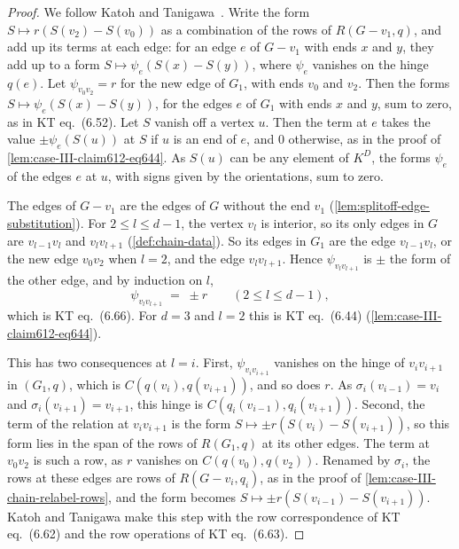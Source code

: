 \begin{proof}
  \leanok
  We follow Katoh and Tanigawa~\cite[pp.~696--698]{katohTanigawa2011}.
  Write the form $S \mapsto r(S(v_2) - S(v_0))$ as a combination of the
  rows of $R(G - v_1, q)$, and add up its terms at each edge: for an edge
  $e$ of $G - v_1$ with ends $x$ and $y$, they add up to a form
  $S \mapsto \psi_e(S(x) - S(y))$, where $\psi_e$ vanishes on the hinge
  $q(e)$. Let $\psi_{v_0 v_2} = r$ for the new edge of $G_1$, with ends
  $v_0$ and $v_2$. Then the forms $S \mapsto \psi_e(S(x) - S(y))$, for the
  edges $e$ of $G_1$ with ends $x$ and $y$, sum to zero, as in KT
  eq.~(6.52). Let $S$ vanish off a vertex $u$. Then the term at $e$ takes
  the value $\pm \psi_e(S(u))$ at $S$ if $u$ is an end of $e$, and $0$
  otherwise, as in the proof of \cref{lem:case-III-claim612-eq644}. As
  $S(u)$ can be any element of $K^D$, the forms $\psi_e$ of the edges $e$
  at $u$, with signs given by the orientations, sum to zero.

  The edges of $G - v_1$ are the edges of $G$ without the end $v_1$
  (\cref{lem:splitoff-edge-substitution}). For $2 \le l \le d - 1$, the
  vertex $v_l$ is interior, so its only edges in $G$ are $v_{l-1} v_l$
  and $v_l v_{l+1}$ (\cref{def:chain-data}). So its edges in $G_1$ are
  the edge $v_{l-1} v_l$, or the new edge $v_0 v_2$ when $l = 2$, and the
  edge $v_l v_{l+1}$. Hence $\psi_{v_l v_{l+1}}$ is $\pm$ the form of the
  other edge, and by induction on $l$,
  \[
    \psi_{v_l v_{l+1}} \;=\; \pm r \qquad (2 \le l \le d - 1),
  \]
  which is KT eq.~(6.66). For $d = 3$ and $l = 2$ this is KT eq.~(6.44)
  (\cref{lem:case-III-claim612-eq644}).

  This has two consequences at $l = i$. First, $\psi_{v_i v_{i+1}}$
  vanishes on the hinge of $v_i v_{i+1}$ in $(G_1, q)$, which is
  $C(q(v_i), q(v_{i+1}))$, and so does $r$. As $\sigma_i(v_{i-1}) = v_i$
  and $\sigma_i(v_{i+1}) = v_{i+1}$, this hinge is
  $C(q_i(v_{i-1}), q_i(v_{i+1}))$. Second, the term of the relation at
  $v_i v_{i+1}$ is the form $S \mapsto \pm r(S(v_i) - S(v_{i+1}))$, so
  this form lies in the span of the rows of $R(G_1, q)$ at its other
  edges. The term at $v_0 v_2$ is such a row, as $r$ vanishes on
  $C(q(v_0), q(v_2))$. Renamed by $\sigma_i$, the rows at these edges are
  rows of $R(G - v_i, q_i)$, as in the proof of
  \cref{lem:case-III-chain-relabel-rows}, and the form becomes
  $S \mapsto \pm r(S(v_{i-1}) - S(v_{i+1}))$. Katoh and Tanigawa make
  this step with the row correspondence of KT eq.~(6.62) and the row
  operations of KT eq.~(6.63).
\end{proof}

